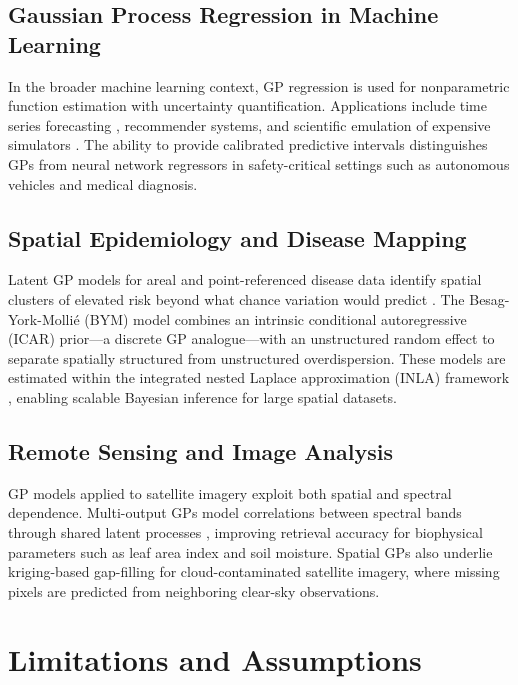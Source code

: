 \documentclass[conference]{IEEEtran}
\begin{document}
\subsection{Gaussian Process Regression in Machine Learning}

In the broader machine learning context, GP regression is used for nonparametric function estimation with uncertainty quantification. Applications include time series forecasting \cite{roberts2013gaussian}, recommender systems, and scientific emulation of expensive simulators \cite{santner2003design}. The ability to provide calibrated predictive intervals distinguishes GPs from neural network regressors in safety-critical settings such as autonomous vehicles and medical diagnosis.

\subsection{Spatial Epidemiology and Disease Mapping}

Latent GP models for areal and point-referenced disease data identify spatial clusters of elevated risk beyond what chance variation would predict \cite{besag1991bayesian}. The Besag-York-Molli\'{e} (BYM) model combines an intrinsic conditional autoregressive (ICAR) prior---a discrete GP analogue---with an unstructured random effect to separate spatially structured from unstructured overdispersion. These models are estimated within the integrated nested Laplace approximation (INLA) framework \cite{rue2009approximate}, enabling scalable Bayesian inference for large spatial datasets.

\subsection{Remote Sensing and Image Analysis}

GP models applied to satellite imagery exploit both spatial and spectral dependence. Multi-output GPs model correlations between spectral bands through shared latent processes \cite{alvarez2012kernels}, improving retrieval accuracy for biophysical parameters such as leaf area index and soil moisture. Spatial GPs also underlie kriging-based gap-filling for cloud-contaminated satellite imagery, where missing pixels are predicted from neighboring clear-sky observations.

\section{Limitations and Assumptions}
\label{sec:limitations}
\end{document}
